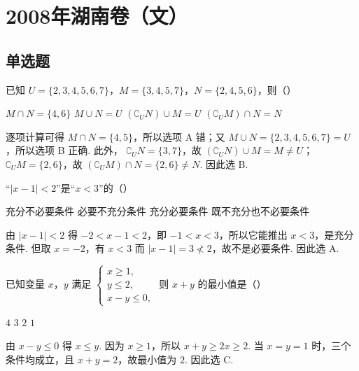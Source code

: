 \chapter{2008年湖南卷（文）}

\section{单选题}

\begin{problem}
已知 \(U = \{2, 3, 4, 5, 6, 7\}\)，\(M = \{3, 4, 5, 7\}\)，\(N = \{2, 4, 5, 6\}\)，则（\quad）

\choices
    {\(M \cap N = \{4, 6\}\)}
    {\(M \cup N = U\)}
    {\((\complement_U N) \cup M = U\)}
    {\((\complement_U M) \cap N = N\)}

\begin{solution}
逐项计算可得
\(M\cap N=\{4,5\}\)，所以选项 A 错；又
\(M\cup N=\{2,3,4,5,6,7\}=U\)，所以选项 B 正确. 此外，
\(\complement_U N=\{3,7\}\)，故
\((\complement_U N)\cup M=M\neq U\)；
\(\complement_U M=\{2,6\}\)，故
\((\complement_U M)\cap N=\{2,6\}\neq N\). 因此选 B.
\end{solution}
\end{problem}

\begin{problem}
“\(|x-1|<2\)”是“\(x<3\)”的（\quad）

\choices
    {充分不必要条件}
    {必要不充分条件}
    {充分必要条件}
    {既不充分也不必要条件}

\begin{solution}
由
\(|x-1|<2\) 得
\(-2<x-1<2\)，即 \(-1<x<3\)，所以它能推出 \(x<3\)，是充分条件. 但取 \(x=-2\)，有 \(x<3\) 而 \(|x-1|=3\not<2\)，故不是必要条件. 因此选 A.
\end{solution}
\end{problem}

\begin{problem}
已知变量 \(x\)，\(y\) 满足 \(\begin{cases}
x \geqslant 1,\\
y \leqslant 2,\\
x - y \leqslant 0,
\end{cases}\) 则 \(x + y\) 的最小值是（\quad）

\choices
    {\(4\)}
    {\(3\)}
    {\(2\)}
    {\(1\)}

\begin{solution}
由 \(x-y\leqslant0\) 得 \(x\leqslant y\). 因为 \(x\geqslant1\)，所以
\(x+y\geqslant2x\geqslant2\). 当 \(x=y=1\) 时，三个条件均成立，且 \(x+y=2\)，故最小值为 \(2\). 因此选 C.
\end{solution}
\end{problem}

